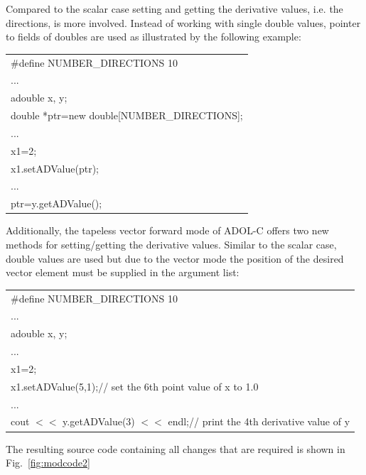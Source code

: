 \documentclass[11pt,twoside]{article}
\begin{document}
Compared to the scalar case setting and getting the derivative
values, i.e. the directions, is more involved. Instead of
working with single {\sf double} values, pointer to fields of {\sf
double}s are used as illustrated by the following example: 
\begin{center}
  \begin{tabular}{l}
    {\sf \#define NUMBER\_DIRECTIONS 10}\\
    ...\\
    {\sf adouble x, y;}\\
    {\sf double *ptr=new double[NUMBER\_DIRECTIONS];}\\
      ...\\
    {\sf x1=2;}\\
    {\sf x1.setADValue(ptr);}\\
    ...\\
    {\sf ptr=y.getADValue();}
  \end{tabular}
\end{center}
Additionally, the tapeless vector forward mode of ADOL-C offers two
new methods for setting/getting the derivative values. Similar
to the scalar case, {\sf double} values are used but due to the vector
mode the position of the desired vector element must be supplied in
the argument list:
\begin{center}
  \begin{tabular}{l}
    {\sf \#define NUMBER\_DIRECTIONS 10}\\
    ...\\
    {\sf adouble x, y;}\\
    ...\\
    {\sf x1=2;}\\
    {\sf x1.setADValue(5,1);\hspace*{3.7cm}// set the 6th point value of x to 1.0}\\
      ...\\
    {\sf cout $<<$ y.getADValue(3) $<<$ endl;\hspace*{1cm}// print the 4th derivative value of y}
  \end{tabular}
\end{center}
The resulting source code containing all changes that are required is
shown in Fig.~\ref{fig:modcode2}
\end{document}
